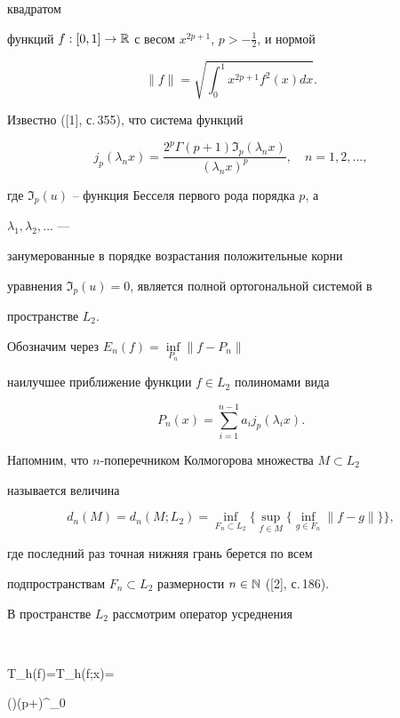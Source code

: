 квадратом 


функций $f:[0,1]\to\Bbb R$ с весом $x^{2p+1}$, $p>-\frac{1}{2}$, и нормой 


$$ 


\|f\|=\sqrt{\displaystyle\int^1_0 x^{2p+1}f^2(x)dx}. 


$$ 


Известно ([1], с.\,355), что система функций 


$$ 


j_p(\lambda_n x)=\frac{2^p\Gamma(p+1)\Im_p(\lambda_n x)} 


{(\lambda_n x)^p},\quad n=1,2,\dotsc,


$$ 


где $\Im_p(u)$ -- функция Бесселя первого рода порядка $p$, а 


$\lambda_1,\lambda_2,\dotsc$ --- 


занумерованные в порядке возрастания положительные корни 


уравнения $\Im_p(u)=0$, является полной ортогональной системой в 


пространстве $L_2$. 


Обозначим через $E_n(f)=\inf\limits_{P_n}\|f-P_n\|$ 


наилучшее приближение функции $f\in L_2$ полиномами вида 


$$ 


P_n(x)=\sum^{n-1}_{i=1}a_i j_p(\lambda_i x). 


$$ 


 


Напомним, что $n$-поперечником Колмогорова множества $M\subset L_2$ 


называется величина 


$$ 


d_n(M)=d_n(M;L_2)=\inf_{F_n\subset L_2}\big\{\sup_{f\in M} 


\{\inf_{g\in F_n}\|f-g\|\}\big\}, 


$$ 


где последний раз точная нижняя грань берется по всем 


подпространствам $F_n\subset L_2$ размерности $n\in\Bbb N$ ([2], с.\,186). 


 


В пространстве $L_2$ рассмотрим оператор усреднения 


$$ 


T_h(f)=T_h(f;x)= 


{\Gamma()\Gamma(p+)}\int^\pi_0 


